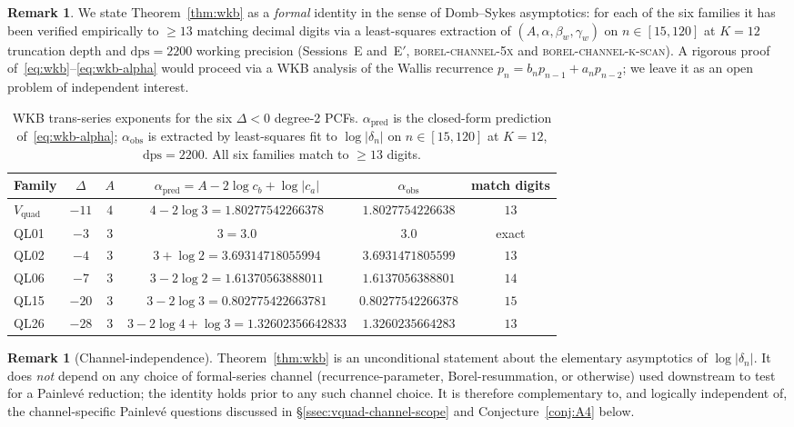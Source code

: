 \documentclass[12pt]{amsart}
\theoremstyle{definition}
\newtheorem{remark}[theorem]{Remark}
\begin{document}
\begin{remark}\label{rem:wkb-formal}
We state Theorem~\ref{thm:wkb} as a \emph{formal} identity in the sense
of Domb--Sykes asymptotics: for each of the six families it has been
verified empirically to $\ge 13$ matching decimal digits via a
least-squares extraction of $(A,\alpha,\beta_{w},\gamma_{w})$ on
$n\in[15,120]$ at $K=12$ truncation depth and $\mathrm{dps}=2200$
working precision (Sessions~E and~E$'$,
\textsc{borel-channel-5x} and \textsc{borel-channel-k-scan}). A
rigorous proof of~\eqref{eq:wkb}--\eqref{eq:wkb-alpha} would proceed
via a WKB analysis of the Wallis recurrence
$p_{n}=b_{n}p_{n-1}+a_{n}p_{n-2}$; we leave it as an open problem
of independent interest.
\end{remark}

\begin{table}[h]
\centering
\small
\begin{tabular}{lccccc}
\toprule
Family & $\Delta$ & $A$ & $\alpha_{\mathrm{pred}}=A-2\log c_{b}+\log|c_{a}|$ & $\alpha_{\mathrm{obs}}$ & match digits \\
\midrule
$V_{\mathrm{quad}}$ & $-11$ & $4$ & $4-2\log 3 = 1.80277542266378$ & $1.8027754226638$ & $13$ \\
QL01 & $-3$ & $3$ & $3 = 3.0$ & $3.0$ & exact \\
QL02 & $-4$ & $3$ & $3 + \log 2 = 3.69314718055994$ & $3.6931471805599$ & $13$ \\
QL06 & $-7$ & $3$ & $3-2\log 2 = 1.61370563888011$ & $1.6137056388801$ & $14$ \\
QL15 & $-20$ & $3$ & $3-2\log 3 = 0.802775422663781$ & $0.80277542266378$ & $15$ \\
QL26 & $-28$ & $3$ & $3-2\log 4 + \log 3 = 1.32602356642833$ & $1.3260235664283$ & $13$ \\
\bottomrule
\end{tabular}
\caption{WKB trans-series exponents for the six $\Delta<0$ degree-2
PCFs. $\alpha_{\mathrm{pred}}$ is the closed-form prediction
of~\eqref{eq:wkb-alpha}; $\alpha_{\mathrm{obs}}$ is extracted by
least-squares fit to $\log|\delta_{n}|$ on $n\in[15,120]$ at
$K=12$, $\mathrm{dps}=2200$. All six families match to
$\ge 13$ digits.}
\label{tab:wkb-exponents}
\end{table}

\begin{remark}[Channel-independence]\label{rem:wkb-channel}
Theorem~\ref{thm:wkb} is an unconditional statement about the
elementary asymptotics of $\log|\delta_{n}|$. It does \emph{not}
depend on any choice of formal-series channel
(recurrence-parameter, Borel-resummation, or otherwise) used
downstream to test for a Painlev\'e reduction; the identity holds
prior to any such channel choice. It is therefore complementary to,
and logically independent of, the channel-specific
Painlev\'e questions discussed in
\S\ref{ssec:vquad-channel-scope} and Conjecture~\ref{conj:A4} below.
\end{remark}
\end{document}
